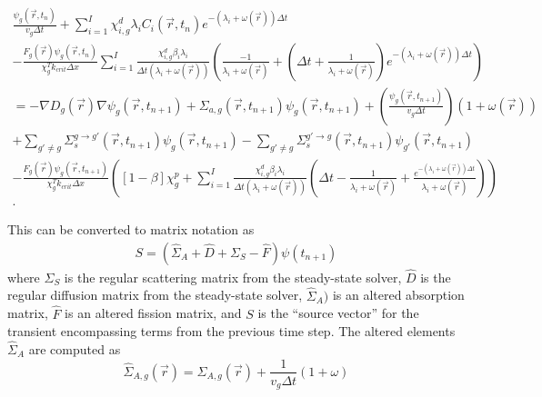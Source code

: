 \documentclass[12pt]{report}
\begin{document}
	\begin{eqnarray}
	\frac{\psi_g(\vec{r},t_{n})}{v_g \Delta t} +  \sum_{i=1}^{I} \chi_{i,g}^d \lambda_i C_i(\vec{r},t_{n}) e^{-\left(\lambda_i + \omega(\vec{r})\right) \Delta t} \nonumber \\
	-  \frac{F_g(\vec{r}) \psi_g(\vec{r},t_{n})}{\chi_g^T k_{crit} \Delta x}  \sum_{i=1}^{I} \frac{\chi_{i,g}^d \beta_i \lambda_i}{\Delta t \left( \lambda_i + \omega(\vec{r}) \right)} \left( \frac{-1}{\lambda_i + \omega(\vec{r})} + \left(\Delta t + \frac{1}{\lambda_i + \omega(\vec{r})} \right)e^{-\left(\lambda_i + \omega(\vec{r}) \right) \Delta t} \right) \nonumber \\
	  = - \nabla D_g(\vec{r}) \nabla \psi_g(\vec{r},t_{n+1}) + \Sigma_{a,g}(\vec{r},t_{n+1}) \psi_g(\vec{r},t_{n+1}) + \left(\frac{\psi_g(\vec{r},t_{n+1})}{v_g \Delta t} \right) \left( 1 + \omega(\vec{r}) \right) \nonumber \\ + \sum_{g'\neq g} \Sigma_{s}^{g\rightarrow g'} (\vec{r},t_{n+1}) \psi_g(\vec{r},t_{n+1}) - \sum_{g' \neq g} \Sigma_{s}^{g'\rightarrow g} (\vec{r},t_{n+1}) \psi_{g'}(\vec{r},t_{n+1}) \nonumber \\
	- \frac{F_g(\vec{r}) \psi_g(\vec{r},t_{n+1})}{\chi_g^T k_{crit} \Delta x} \left(\left[ 1- \beta \right] \chi_g^p + \sum_{i=1}^{I} \frac{\chi_{i,g}^d \beta_i \lambda_i}{\Delta t \left( \lambda_i + \omega(\vec{r}) \right)} \left( \Delta t - \frac{1}{\lambda_i + \omega(\vec{r})} + \frac{e^{-\left( \lambda_i + \omega(\vec{r}) \right) \Delta t}}{\lambda_i + \omega(\vec{r})}\right) \right) \nonumber \\ 
	\nonumber.
	\end{eqnarray}
	
	This can be converted to matrix notation as
	\begin{eqnarray}
	S = \left( \hat{\Sigma}_A +  \hat{D} + \Sigma_S - \hat{F} \right) \psi(t_{n+1})
	\end{eqnarray}
	where $\Sigma_S$ is the regular scattering matrix from the steady-state solver, $\hat{D}$ is the regular diffusion matrix from the steady-state solver, $\hat{\Sigma}_A)$ is an altered absorption matrix, $\hat{F}$ is an altered fission matrix, and $S$ is the ``source vector'' for the transient  encompassing terms from the previous time step. The altered elements $\hat{\Sigma}_A$ are computed as
	\begin{equation}
	\hat{\Sigma}_{A,g}(\vec{r}) = \Sigma_{A,g}(\vec{r}) + \frac{1}{v_g \Delta t} \left( 1 + \omega \right)
	\end{equation}
	
\end{document}

